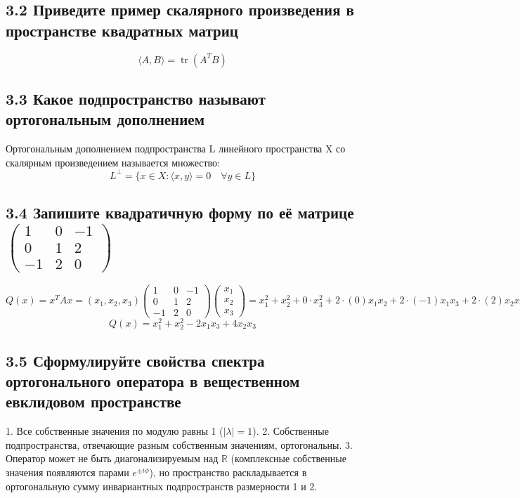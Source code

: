 \documentclass{article}
\begin{document}
\subsection*{3.2 Приведите пример скалярного произведения в пространстве квадратных матриц}
\[\langle A, B \rangle = \operatorname{tr}(A^T B)\]

\subsection*{3.3 Какое подпространство называют ортогональным дополнением}
Ортогональным дополнением подпространства L линейного пространства X со скалярным произведением называется множество:
\[L^\perp = \{x \in X : \langle x, y \rangle = 0 \quad \forall y \in L\}\]

\subsection*{3.4 Запишите квадратичную форму по её матрице \( \begin{pmatrix} 1 & 0 & -1 \\ 0 & 1 & 2 \\ -1 & 2 & 0 \end{pmatrix} \)}
\[Q(x) = x^T A x = (x_1, x_2, x_3) \begin{pmatrix} 1 & 0 & -1 \\ 0 & 1 & 2 \\ -1 & 2 & 0 \end{pmatrix} \begin{pmatrix} x_1 \\ x_2 \\ x_3 \end{pmatrix} = x_1^2 + x_2^2 + 0\cdot x_3^2 + 2\cdot(0)x_1x_2 + 2\cdot(-1)x_1x_3 + 2\cdot(2)x_2x_3\]
\[Q(x) = x_1^2 + x_2^2 - 2x_1x_3 + 4x_2x_3\]

\subsection*{3.5 Сформулируйте свойства спектра ортогонального оператора в вещественном евклидовом пространстве}
1. Все собственные значения по модулю равны 1 (\( |\lambda| = 1 \)).
2. Собственные подпространства, отвечающие разным собственным значениям, ортогональны.
3. Оператор может не быть диагонализируемым над \( \mathbb{R} \) (комплексные собственные значения появляются парами \( e^{\pm i\phi} \)), но пространство раскладывается в ортогональную сумму инвариантных подпространств размерности 1 и 2.
\end{document}
